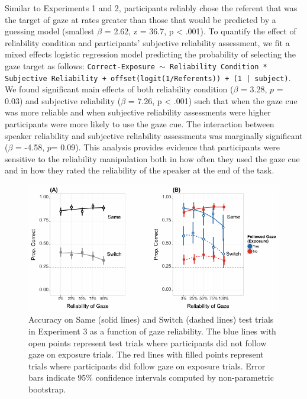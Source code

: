 \documentclass[authoryear, review]{elsarticle}
\newenvironment{CodeChunk}{}{}
\begin{document}
Similar to Experiments 1 and 2, participants reliably chose the referent
that was the target of gaze at rates greater than those that would be
predicted by a guessing model (smallest \(\beta\) = 2.62, z = 36.7, p
\textless{} .001). To quantify the effect of reliability condition and
participants' subjective reliability assessment, we fit a mixed effects
logistic regression model predicting the probability of selecting the
gaze target as follows:
\texttt{Correct-Exposure $\sim$ Reliability Condition * Subjective Reliability + offset(logit(1/Referents)) + (1 | subject)}.
We found significant main effects of both reliability condition
(\(\beta\) = 3.28, \(p\) = 0.03) and subjective reliability (\(\beta\) =
7.26, p \textless{} .001) such that when the gaze cue was more reliable
and when subjective reliability assessments were higher participants
were more likely to use the gaze cue. The interaction between speaker
reliability and subjective reliability assessments was marginally
significant (\(\beta\) = -4.58, \(p\)= 0.09). This analysis provides
evidence that participants were sensitive to the reliability
manipulation both in how often they used the gaze cue and in how they
rated the reliability of the speaker at the end of the task.

\begin{CodeChunk}
\begin{figure}[tb]
\includegraphics{figs/e3-main-plot-1} \caption[Accuracy on Same (solid lines) and Switch (dashed lines) test trials in Experiment 3 as a function of gaze reliability]{Accuracy on Same (solid lines) and Switch (dashed lines) test trials in Experiment 3 as a function of gaze reliability. The blue lines with open points represent test trials where participants did not follow gaze on exposure trials. The red lines with filled points represent trials where participants did follow gaze on exposure trials. Error bars indicate 95\% confidence intervals computed by non-parametric bootstrap.}\label{fig:e3-main-plot}
\end{figure}
\end{CodeChunk}
\end{document}
